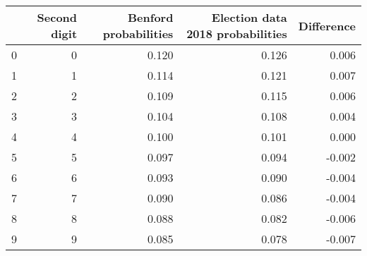 \begin{tabular}{lrrrr}
\toprule
 & Second digit & Benford probabilities & Election data 2018 probabilities & Difference \\
\midrule
0 & 0 & 0.120 & 0.126 & 0.006 \\
1 & 1 & 0.114 & 0.121 & 0.007 \\
2 & 2 & 0.109 & 0.115 & 0.006 \\
3 & 3 & 0.104 & 0.108 & 0.004 \\
4 & 4 & 0.100 & 0.101 & 0.000 \\
5 & 5 & 0.097 & 0.094 & -0.002 \\
6 & 6 & 0.093 & 0.090 & -0.004 \\
7 & 7 & 0.090 & 0.086 & -0.004 \\
8 & 8 & 0.088 & 0.082 & -0.006 \\
9 & 9 & 0.085 & 0.078 & -0.007 \\
\bottomrule
\end{tabular}
